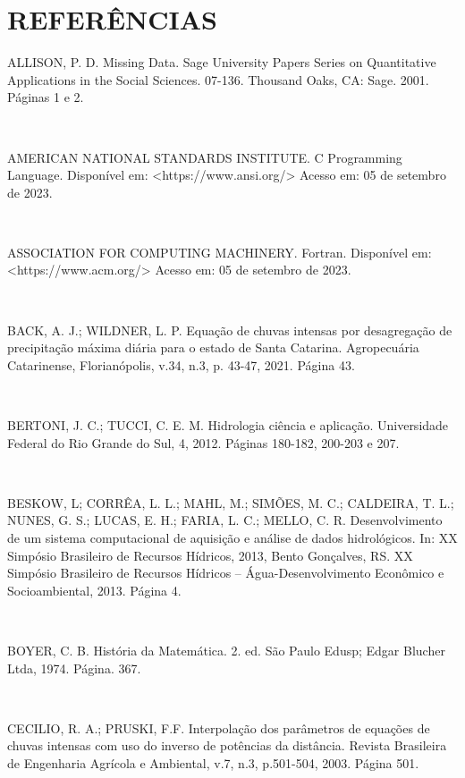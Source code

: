 \chapter*{REFERÊNCIAS}

\begin{flushleft}
\singlespacing
ALLISON, P. D. Missing Data. Sage University Papers Series on Quantitative Applications in the Social Sciences. 07-136. Thousand Oaks, CA: Sage. 2001. Páginas 1 e 2.

\

AMERICAN NATIONAL STANDARDS INSTITUTE. C Programming Language. Disponível em: <https://www.ansi.org/> Acesso em: 05 de setembro de 2023.

\

ASSOCIATION FOR COMPUTING  MACHINERY. Fortran. Disponível em: <https://www.acm.org/> Acesso em: 05 de setembro de 2023.

\

BACK, A. J.; WILDNER, L. P. Equação de chuvas intensas por desagregação de precipitação máxima diária para o estado de Santa Catarina. Agropecuária Catarinense, Florianópolis, v.34, n.3, p. 43-47, 2021. Página 43.

\

BERTONI, J. C.; TUCCI, C. E. M. Hidrologia ciência e aplicação. Universidade Federal do Rio Grande do Sul, 4, 2012. Páginas 180-182, 200-203 e 207.

\

BESKOW, L; CORRÊA, L. L.; MAHL, M.; SIMÕES, M. C.; CALDEIRA, T. L.; NUNES, G. S.; LUCAS, E. H.; FARIA, L. C.; MELLO, C. R. Desenvolvimento de um sistema computacional de aquisição e análise de dados hidrológicos. In: XX Simpósio Brasileiro de Recursos Hídricos, 2013, Bento Gonçalves, RS. XX Simpósio Brasileiro de Recursos Hídricos – Água-Desenvolvimento Econômico e Socioambiental, 2013. Página 4.

\

BOYER, C. B. História da Matemática. 2. ed. São Paulo Edusp; Edgar Blucher Ltda, 1974. Página. 367.

\

CECILIO, R. A.; PRUSKI, F.F. Interpolação dos parâmetros de equações de chuvas intensas com uso do inverso de potências da distância. Revista Brasileira de Engenharia Agrícola e Ambiental, v.7, n.3, p.501-504, 2003. Página 501.


\end{flushleft}
